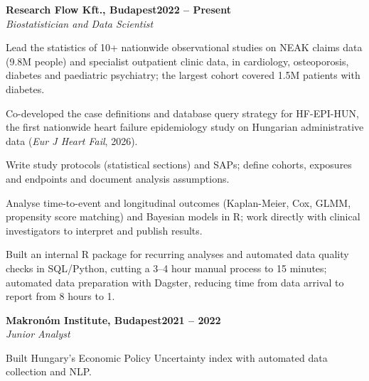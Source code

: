 \documentclass[a4paper,10pt]{article}
\newcommand{\heading}[2]{
  \hspace{10pt}#1\hfill#2\\
}
\newcommand{\headingBf}[2]{
  \heading{\textbf{#1}}{\textbf{#2}}
}
\newcommand{\headingIt}[2]{
  \heading{\textit{#1}}{\textit{#2}}
}
\newenvironment{resume_list}{
  \vspace{-7pt}
  \begin{itemize}[itemsep=-2px, parsep=1pt, leftmargin=30pt]
}{
  \end{itemize}
}
\begin{document}
  \headingBf{Research Flow Kft., Budapest}{2022 -- Present}
  \headingIt{Biostatistician and Data Scientist}{}
\begin{resume_list}
  \item Lead the statistics of 10+ nationwide observational studies on NEAK claims data (9.8M people) and specialist outpatient clinic data, in cardiology, osteoporosis, diabetes and paediatric psychiatry; the largest cohort covered 1.5M patients with diabetes.
  \item Co-developed the case definitions and database query strategy for HF-EPI-HUN, the first nationwide heart failure epidemiology study on Hungarian administrative data (\textit{Eur J Heart Fail}, 2026).
  \item Write study protocols (statistical sections) and SAPs; define cohorts, exposures and endpoints and document analysis assumptions.
  \item Analyse time-to-event and longitudinal outcomes (Kaplan-Meier, Cox, GLMM, propensity score matching) and Bayesian models in R; work directly with clinical investigators to interpret and publish results.
  \item Built an internal R package for recurring analyses and automated data quality checks in SQL/Python, cutting a 3--4 hour manual process to 15 minutes; automated data preparation with Dagster, reducing time from data arrival to report from 8 hours to 1.
\end{resume_list}

  \headingBf{Makronóm Institute, Budapest}{2021 -- 2022}
  \headingIt{Junior Analyst}{}
  \begin{resume_list}
    \item Built Hungary's Economic Policy Uncertainty index with automated data collection and NLP.
  \end{resume_list}

\end{document}
